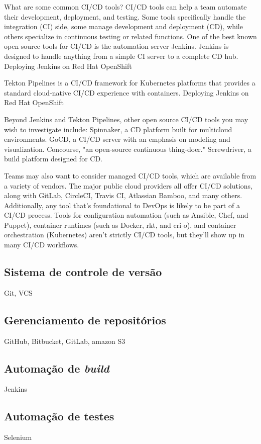 What are some common CI/CD tools?
CI/CD tools can help a team automate their development, deployment, and testing. Some tools specifically handle the integration (CI) side, some manage development and deployment (CD), while others specialize in continuous testing or related functions.
One of the best known open source tools for CI/CD is the automation server Jenkins. Jenkins is designed to handle anything from a simple CI server to a complete CD hub.
Deploying Jenkins on Red Hat OpenShift

Tekton Pipelines is a CI/CD framework for Kubernetes platforms that provides a standard cloud-native CI/CD experience with containers.
Deploying Jenkins on Red Hat OpenShift

Beyond Jenkins and Tekton Pipelines, other open source CI/CD tools you may wish to investigate include:
    Spinnaker, a CD platform built for multicloud environments.
    GoCD, a CI/CD server with an emphasis on modeling and visualization.
    Concourse, "an open-source continuous thing-doer."
    Screwdriver, a build platform designed for CD.

Teams may also want to consider managed CI/CD tools, which are available from a variety of vendors. The major public cloud providers all offer CI/CD solutions, along with GitLab, CircleCI, Travis CI, Atlassian Bamboo, and many others.
Additionally, any tool that’s foundational to DevOps is likely to be part of a CI/CD process. Tools for configuration automation (such as Ansible, Chef, and Puppet), container runtimes (such as Docker, rkt, and cri-o), and container orchestration (Kubernetes) aren’t strictly CI/CD tools, but they’ll show up in many CI/CD workflows. \cite{redhat-ci-cd}

\subsection{Sistema de controle de versão}
Git, VCS

\subsection{Gerenciamento de repositórios}
GitHub, Bitbucket, GitLab, amazon S3



\subsection{Automação de \emph{build}}
Jenkins

\subsection{Automação de testes}
Selenium

